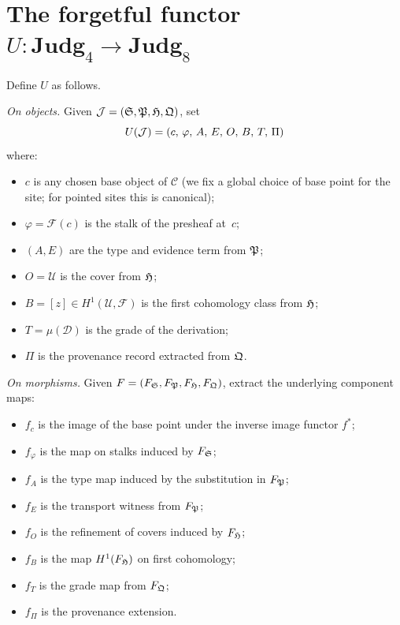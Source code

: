 \section{The forgetful functor $U : \mathbf{Judg}_4 \to \mathbf{Judg}_8$}
\label{sec:forgetful}

\begin{construction}
\label{con:forgetful}
Define $U$ as follows.

\emph{On objects.} Given $\mathcal{J} = (\mathfrak{S}, \mathfrak{P}, \mathfrak{H}, \mathfrak{Q})$, set
\[
  U(\mathcal{J}) = (c,\, \varphi,\, A,\, E,\, O,\, B,\, T,\, \Pi)
\]
where:
\begin{itemize}[nosep]
\item $c$ is any chosen base object of $\mathcal{C}$ (we fix a global
  choice of base point for the site; for pointed sites this is
  canonical);
\item $\varphi = \mathcal{F}(c)$ is the stalk of the presheaf at~$c$;
\item $(A, E)$ are the type and evidence term from $\mathfrak{P}$;
\item $O = \mathcal{U}$ is the cover from $\mathfrak{H}$;
\item $B = [z] \in H^1(\mathcal{U}, \mathcal{F})$ is the first
  cohomology class from $\mathfrak{H}$;
\item $T = \mu(\mathcal{D})$ is the grade of the derivation;
\item $\Pi$ is the provenance record extracted from $\mathfrak{Q}$.
\end{itemize}

\emph{On morphisms.} Given $F = (F_{\mathfrak{S}}, F_{\mathfrak{P}}, F_{\mathfrak{H}},
F_{\mathfrak{Q}})$, extract the underlying component maps:
\begin{itemize}[nosep]
\item $f_c$ is the image of the base point under the inverse image
  functor $f^*$;
\item $f_\varphi$ is the map on stalks induced by $F_{\mathfrak{S}}$;
\item $f_A$ is the type map induced by the substitution in $F_{\mathfrak{P}}$;
\item $f_E$ is the transport witness from $F_{\mathfrak{P}}$;
\item $f_O$ is the refinement of covers induced by $F_{\mathfrak{H}}$;
\item $f_B$ is the map $H^1(F_{\mathfrak{H}})$ on first cohomology;
\item $f_T$ is the grade map from $F_{\mathfrak{Q}}$;
\item $f_\Pi$ is the provenance extension.
\end{itemize}
\end{construction}

